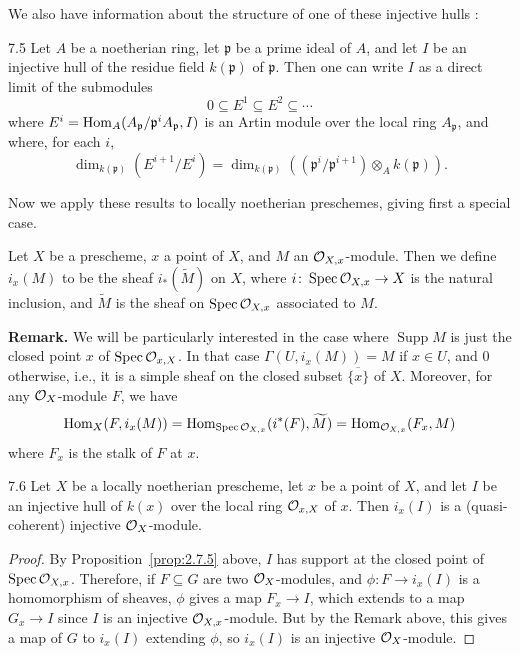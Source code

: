 We also have information about the structure of one of these injective hulls \cite{13}:

\begin{bookproposition}{7.5}\label{prop:2.7.5}
Let $A$ be a noetherian ring, let $\mathfrak{p}$ be a prime ideal of $A$, and let $I$ be an injective hull of the residue field $k(\mathfrak{p})$ of $\mathfrak{p}$. Then one can write $I$ as a direct limit of the submodules
\[
0 \subseteq E^1 \subseteq E^2 \subseteq \cdots
\]
where $E^i = \operatorname{Hom}_A(A_{\mathfrak{p}}/\mathfrak{p}^i A_{\mathfrak{p}}, I)$ is an Artin module over the local ring $A_{\mathfrak{p}}$, and where, for each $i$,
\[
\dim_{k(\mathfrak{p})}(E^{i+1}/E^i) = \dim_{k(\mathfrak{p})}((\mathfrak{p}^i/\mathfrak{p}^{i+1})\otimes_A k(\mathfrak{p})).
\]
\end{bookproposition}

Now we apply these results to locally noetherian preschemes, giving first a special case.

\begin{definition*}
Let $X$ be a prescheme, $x$ a point of $X$, and $M$ an $\mathcal{O}_{X,x}$-module. Then we define $i_x(M)$ to be the sheaf $i_*(\widetilde{M})$ on $X$, where $i\colon \operatorname{Spec}\mathcal{O}_{X,x}\to X$ is the natural inclusion, and $\widetilde{M}$ is the sheaf on $\operatorname{Spec}\mathcal{O}_{X,x}$ associated to $M$.
\end{definition*}

\textbf{Remark.}
We will be particularly interested in the case where $\operatorname{Supp}M$ is just the closed point $x$ of $\operatorname{Spec}\mathcal{O}_{x,X}$. In that case $\Gamma(U,i_x(M))=M$ if $x\in U$, and $0$ otherwise, i.e., it is a simple sheaf on the closed subset $\overline{\{x\}}$ of $X$. Moreover, for any $\mathcal{O}_X$-module $F$, we have
\[
\operatorname{Hom}_X(F, i_x(M)) = \operatorname{Hom}_{\operatorname{Spec}\mathcal{O}_{X,x}}(i^*(F), \widetilde{M}) = \operatorname{Hom}_{\mathcal{O}_{X,x}}(F_x, M)
\]
where $F_x$ is the stalk of $F$ at $x$.

\begin{bookproposition}{7.6}\label{prop:2.7.6}
Let $X$ be a locally noetherian prescheme, let $x$ be a point of $X$, and let $I$ be an injective hull of $k(x)$ over the local ring $\mathcal{O}_{x,X}$ of $x$. Then $i_x(I)$ is a (quasi-coherent) injective $\mathcal{O}_X$-module.
\end{bookproposition}

\begin{proof}
By Proposition~\ref{prop:2.7.5} above, $I$ has support at the closed point of $\operatorname{Spec}\mathcal{O}_{X,x}$. Therefore, if $F\subseteq G$ are two $\mathcal{O}_X$-modules, and $\phi\colon F\to i_x(I)$ is a homomorphism of sheaves, $\phi$ gives a map $F_x\to I$, which extends to a map $G_x\to I$ since $I$ is an injective $\mathcal{O}_{X,x}$-module. But by the Remark above, this gives a map of $G$ to $i_x(I)$ extending $\phi$, so $i_x(I)$ is an injective $\mathcal{O}_X$-module.
\end{proof}

